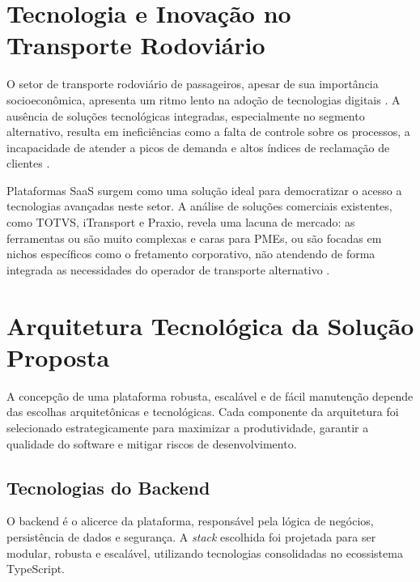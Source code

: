 \section{Tecnologia e Inovação no Transporte Rodoviário}

O setor de transporte rodoviário de passageiros, apesar de sua importância socioeconômica, apresenta um ritmo lento na adoção de tecnologias digitais \cite{sestsenat2021relatorio}. A ausência de soluções tecnológicas integradas, especialmente no segmento alternativo, resulta em ineficiências como a falta de controle sobre os processos, a incapacidade de atender a picos de demanda e altos índices de reclamação de clientes \cite{fateczl2022impactos}.

Plataformas SaaS surgem como uma solução ideal para democratizar o acesso a tecnologias avançadas neste setor. A análise de soluções comerciais existentes, como TOTVS, iTransport e Praxio, revela uma lacuna de mercado: as ferramentas ou são muito complexas e caras para PMEs, ou são focadas em nichos específicos como o fretamento corporativo, não atendendo de forma integrada as necessidades do operador de transporte alternativo \cite{totvs2025passageiros, itransport2025gestao, praxioluna2025venda}.

\section{Arquitetura Tecnológica da Solução Proposta}

A concepção de uma plataforma robusta, escalável e de fácil manutenção depende das escolhas arquitetônicas e tecnológicas. Cada componente da arquitetura foi selecionado estrategicamente para maximizar a produtividade, garantir a qualidade do software e mitigar riscos de desenvolvimento.

\subsection{Tecnologias do Backend}

O backend é o alicerce da plataforma, responsável pela lógica de negócios, persistência de dados e segurança. A \textit{stack} escolhida foi projetada para ser modular, robusta e escalável, utilizando tecnologias consolidadas no ecossistema TypeScript.


